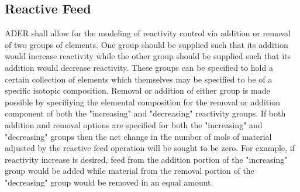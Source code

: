\documentclass[12pt]{article}
\begin{document}
\subsection{Reactive Feed}
ADER shall allow for the modeling of reactivity control via addition or
removal of two groups of elements. One group should be supplied such that its
addition would increase reactivity while the other group should be supplied
such that its addition would decrease reactivity. These groups can be
specified to hold a certain collection of elements which themselves
may be specified to be of a specific isotopic composition. Removal or addition
of either group is made possible by specifiying the elemental composition
for the removal or addition component of both the "increasing" and "decreasing"
reactivity groups. If both addition and removal options are specified for
both the "increasing" and "decreasing" groups then the net change in the number
of mols of material adjusted by the reactive feed operation will be sought to
be zero. For example, if reactivity increase is desired, feed from the addition
portion of the "increasing" group would be added while material from the
removal portion of the "decreasing" group would be removed in an equal amount.
\end{document}
